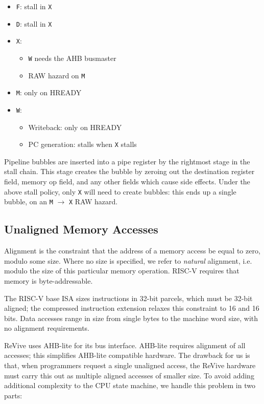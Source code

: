 \documentclass{article}
\begin{document}
\begin{itemize}
	\item \texttt{F}: stall in \texttt{X}
	\item \texttt{D}: stall in \texttt{X}
	\item \texttt{X}:
	\begin{itemize}
		\item \texttt{W} needs the AHB busmaster
		\item RAW hazard on \texttt{M}
	\end{itemize}
	\item \texttt{M}: only on HREADY
	\item \texttt{W}:
	\begin{itemize}
		\item Writeback: only on HREADY
		\item PC generation: stalls when \texttt{X} stalls
	\end{itemize}
\end{itemize}

Pipeline bubbles are inserted into a pipe register by the rightmost stage in the stall chain. This stage creates the bubble by zeroing out the destination register field, memory op field, and any other fields which cause side effects. Under the above stall policy, only \texttt{X} will need to create bubbles: this ends up a single bubble, on an \texttt{M} $\to$ \texttt{X} RAW hazard.

\subsection{Unaligned Memory Accesses}

Alignment is the constraint that the address of a memory access be equal to zero, modulo some size. Where no size is specified, we refer to \textit{natural} alignment, i.e. modulo the size of this particular memory operation. RISC-V requires that memory is byte-addressable.

The RISC-V base ISA sizes instructions in 32-bit parcels, which must be 32-bit aligned; the compressed instruction extension relaxes this constraint to 16 and 16 bits. Data accesses range in size from single bytes to the machine word size, with no alignment requirements. 

ReVive uses AHB-lite for its bus interface. AHB-lite requires alignment of all accesses; this simplifies AHB-lite compatible hardware. The drawback for us is that, when programmers request a single unaligned access, the ReVive hardware must carry this out as multiple aligned accesses of smaller size. To avoid adding additional complexity to the CPU state machine, we handle this problem in two parts:
\end{document}
